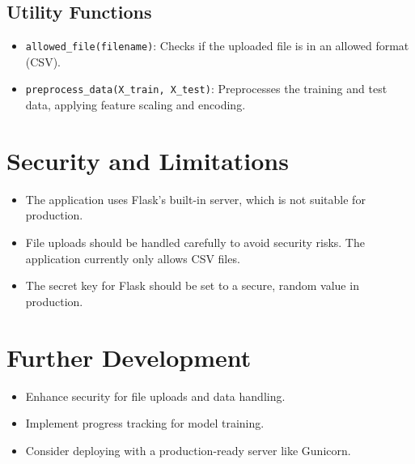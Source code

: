 \documentclass{article}
\begin{document}
\subsection{Utility Functions}
\begin{itemize}
    \item \texttt{allowed\_file(filename)}: Checks if the uploaded file is in an allowed format (CSV).
    \item \texttt{preprocess\_data(X\_train, X\_test)}: Preprocesses the training and test data, applying feature scaling and encoding.
\end{itemize}

\section{Security and Limitations}
\begin{itemize}
    \item The application uses Flask's built-in server, which is not suitable for production.
    \item File uploads should be handled carefully to avoid security risks. The application currently only allows CSV files.
    \item The secret key for Flask should be set to a secure, random value in production.
\end{itemize}

\section{Further Development}
\begin{itemize}
    \item Enhance security for file uploads and data handling.
    \item Implement progress tracking for model training.
    \item Consider deploying with a production-ready server like Gunicorn.
\end{itemize}
\end{document}
